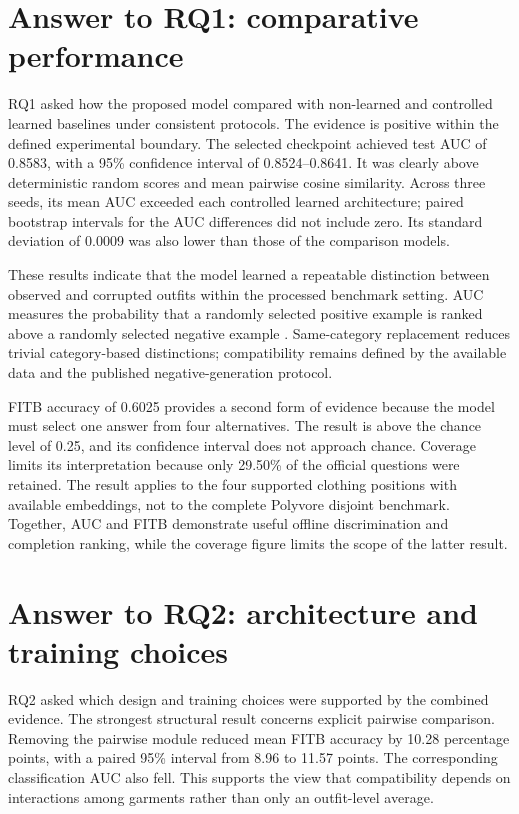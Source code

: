 \section{Answer to RQ1: comparative performance}

RQ1 asked how the proposed model compared with non-learned and controlled
learned baselines under consistent protocols. The evidence is positive within
the defined experimental boundary. The selected checkpoint achieved test AUC of 0.8583, with
a 95\% confidence interval of 0.8524--0.8641. It was clearly above
deterministic random scores and mean pairwise cosine similarity. Across three
seeds, its mean AUC exceeded each controlled learned architecture; paired
bootstrap intervals for the AUC differences did not include zero. Its standard
deviation of 0.0009 was also lower than those of the comparison models.

These results indicate that the model learned a repeatable distinction between
observed and corrupted outfits within the processed benchmark
setting. AUC measures the probability that a randomly selected positive
example is ranked above a randomly selected negative example
\parencite{fawcett2006roc}. Same-category replacement reduces trivial
category-based distinctions; compatibility remains defined by the available
data and the published negative-generation protocol.

FITB accuracy of 0.6025 provides a second form of evidence because the model
must select one answer from four alternatives. The result is above the chance
level of 0.25, and its confidence interval does not approach chance. Coverage
limits its interpretation because only 29.50\% of the official questions were
retained. The result applies to
the four supported clothing positions with available embeddings, not to the
complete Polyvore disjoint benchmark. Together, AUC and FITB demonstrate useful
offline discrimination and completion ranking, while the coverage figure
limits the scope of the latter result.

\section{Answer to RQ2: architecture and training choices}

RQ2 asked which design and training choices were supported by the combined
evidence. The strongest structural result concerns explicit pairwise
comparison. Removing the pairwise module reduced mean FITB accuracy by 10.28
percentage points, with a paired 95\% interval from 8.96 to 11.57 points. The
corresponding classification AUC also fell. This supports the view that
compatibility depends on interactions among garments rather than only an
outfit-level average.

